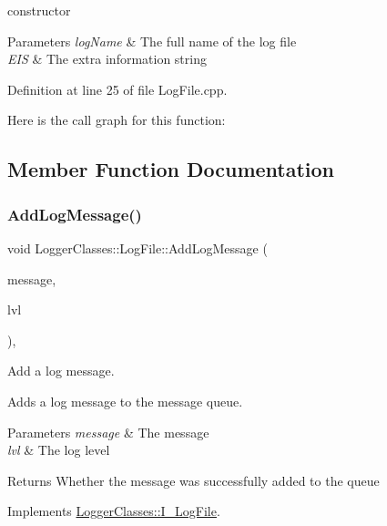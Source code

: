 constructor 


\begin{DoxyParams}{Parameters}
{\em log\+Name} & The full name of the log file \\
\hline
{\em E\+IS} & The extra information string \\
\hline
\end{DoxyParams}


Definition at line 25 of file Log\+File.\+cpp.

Here is the call graph for this function\+:


\subsection{Member Function Documentation}
\mbox{\label{classLoggerClasses_1_1LogFile_aa9241471ffd75bfbf5d98dd536128479}} 
\subsubsection{\texorpdfstring{AddLogMessage()}{AddLogMessage()}}
{\footnotesize\ttfamily void Logger\+Classes\+::\+Log\+File\+::\+Add\+Log\+Message (\begin{DoxyParamCaption}\item[{const std\+::string \&}]{message,  }\item[{log\+Level}]{lvl }\end{DoxyParamCaption})\hspace{0.3cm}{\ttfamily [override]}, {\ttfamily [virtual]}}



Add a log message. 

Adds a log message to the message queue.


\begin{DoxyParams}{Parameters}
{\em message} & The message \\
\hline
{\em lvl} & The log level \\
\hline
\end{DoxyParams}
\begin{DoxyReturn}{Returns}
Whether the message was successfully added to the queue 
\end{DoxyReturn}


Implements \mbox{\hyperlink{classLoggerClasses_1_1I__LogFile_af928354dfce0f9ad54730faee0f5dbab}{Logger\+Classes\+::\+I\+\_\+\+Log\+File}}.



